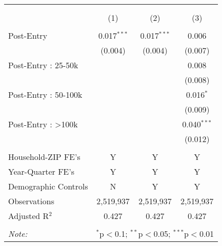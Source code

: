 
\begin{table}[!htbp] \centering 
  \caption{} 
  \label{} 
\begin{tabular}{@{\extracolsep{5pt}}lccc} 
\\[-1.8ex]\hline 
\hline \\[-1.8ex] 
\\[-1.8ex] & (1) & (2) & (3)\\ 
\hline \\[-1.8ex] 
 Post-Entry & 0.017$^{***}$ & 0.017$^{***}$ & 0.006 \\ 
  & (0.004) & (0.004) & (0.007) \\ 
  Post-Entry : 25-50k &  &  & 0.008 \\ 
  &  &  & (0.008) \\ 
  Post-Entry : 50-100k &  &  & 0.016$^{*}$ \\ 
  &  &  & (0.009) \\ 
  Post-Entry : >100k &  &  & 0.040$^{***}$ \\ 
  &  &  & (0.012) \\ 
 \hline \\[-1.8ex] 
Household-ZIP FE's & Y & Y & Y \\ 
Year-Quarter FE's & Y & Y & Y \\ 
Demographic Controls & N & Y & Y \\ 
Observations & 2,519,937 & 2,519,937 & 2,519,937 \\ 
Adjusted R$^{2}$ & 0.427 & 0.427 & 0.427 \\ 
\hline 
\hline \\[-1.8ex] 
\textit{Note:}  & \multicolumn{3}{l}{$^{*}$p$<$0.1; $^{**}$p$<$0.05; $^{***}$p$<$0.01} \\ 
\end{tabular} 
\end{table} 

